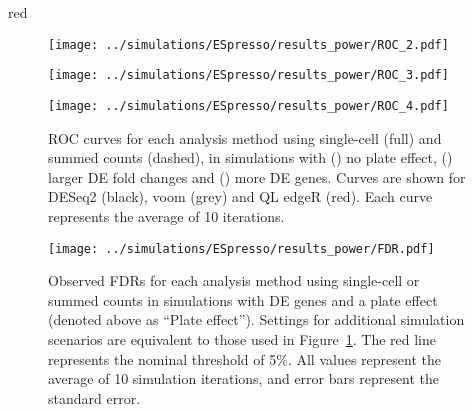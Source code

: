 \documentclass{article}
\begin{document}
\begin{color}{red}
\begin{figure}[p]
    \begin{center}
    \begin{minipage}{0.32\textwidth}
        \texttt{[image: ../simulations/ESpresso/results\_power/ROC\_2.pdf]}
        \subcaption[]{}
        \label{subfig:noplate}
    \end{minipage}
    \begin{minipage}{0.32\textwidth}
        \texttt{[image: ../simulations/ESpresso/results\_power/ROC\_3.pdf]}
        \subcaption[]{}
        \label{subfig:bigfc}
    \end{minipage}
    \begin{minipage}{0.32\textwidth}
        \texttt{[image: ../simulations/ESpresso/results\_power/ROC\_4.pdf]}
        \subcaption[]{}
        \label{subfig:morede}
    \end{minipage}
    \end{center}
    \caption{  
        ROC curves for each analysis method using single-cell (full) and summed counts (dashed), in simulations with () no plate effect, () larger DE fold changes and () more DE genes. 
        Curves are shown for DESeq2 (black), voom (grey) and QL edgeR (red).
        Each curve represents the average of 10 iterations.
    }
    \label{fig:altroc}
\end{figure}

\begin{figure}[p]
    \begin{center}
        \texttt{[image: ../simulations/ESpresso/results\_power/FDR.pdf]}
    \end{center}
    \caption{
        Observed FDRs for each analysis method using single-cell or summed counts in simulations with DE genes and a plate effect (denoted above as ``Plate effect'').
        Settings for additional simulation scenarios are equivalent to those used in Figure~\ref{fig:altroc}.
        The red line represents the nominal threshold of 5\%.
        All values represent the average of 10 simulation iterations, and error bars represent the standard error.
    }
\end{figure}
\end{color}
\end{document}

